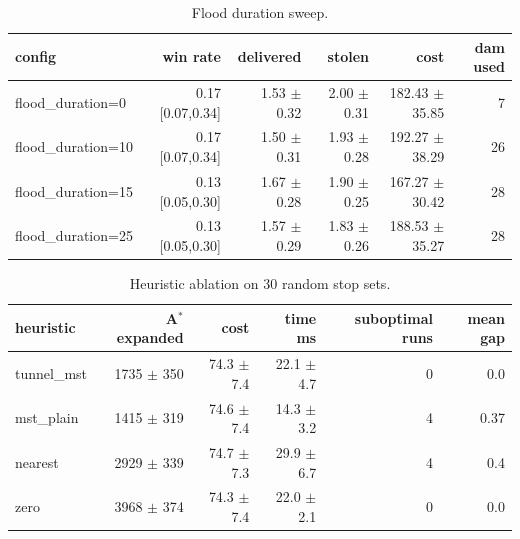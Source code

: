 \begin{table}[t]
\centering
\footnotesize
\caption{Flood duration sweep.}
\label{tab:flood}
\setlength{\tabcolsep}{3pt}
\begin{tabular}{lrrrrr}
\toprule
config & win rate & delivered & stolen & cost & dam used \\
\midrule
flood\_duration=0 & 0.17 [0.07,0.34] & 1.53 $\pm$ 0.32 & 2.00 $\pm$ 0.31 & 182.43 $\pm$ 35.85 & 7 \\
flood\_duration=10 & 0.17 [0.07,0.34] & 1.50 $\pm$ 0.31 & 1.93 $\pm$ 0.28 & 192.27 $\pm$ 38.29 & 26 \\
flood\_duration=15 & 0.13 [0.05,0.30] & 1.67 $\pm$ 0.28 & 1.90 $\pm$ 0.25 & 167.27 $\pm$ 30.42 & 28 \\
flood\_duration=25 & 0.13 [0.05,0.30] & 1.57 $\pm$ 0.29 & 1.83 $\pm$ 0.26 & 188.53 $\pm$ 35.27 & 28 \\
\bottomrule
\end{tabular}
\end{table}

\begin{table}[t]
\centering
\footnotesize
\caption{Heuristic ablation on 30 random stop sets.}
\label{tab:abl}
\setlength{\tabcolsep}{3pt}
\begin{tabular}{lrrrrr}
\toprule
heuristic & A$^*$ expanded & cost & time ms & suboptimal runs & mean gap \\
\midrule
tunnel\_mst & 1735 $\pm$ 350 & 74.3 $\pm$ 7.4 & 22.1 $\pm$ 4.7 & 0 & 0.0 \\
mst\_plain & 1415 $\pm$ 319 & 74.6 $\pm$ 7.4 & 14.3 $\pm$ 3.2 & 4 & 0.37 \\
nearest & 2929 $\pm$ 339 & 74.7 $\pm$ 7.3 & 29.9 $\pm$ 6.7 & 4 & 0.4 \\
zero & 3968 $\pm$ 374 & 74.3 $\pm$ 7.4 & 22.0 $\pm$ 2.1 & 0 & 0.0 \\
\bottomrule
\end{tabular}
\end{table}
